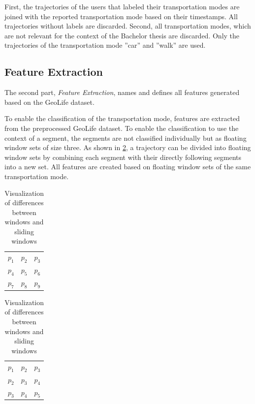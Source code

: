 First, the trajectories of the users that labeled their transportation modes are joined with the reported transportation mode based on their timestamps. All trajectories without labels are discarded. Second, all transportation modes, which are not relevant for the context of the Bachelor thesis are discarded. Only the trajectories of the transportation mode ''car'' and ''walk'' are used.

\subsection{Feature Extraction}
The second part, \textit{Feature Extraction}, names and defines all features generated based on the GeoLife dataset.

To enable the classification of the transportation mode, features are extracted from the preprocessed GeoLife dataset. To enable the classification to use the context of a segment, the segments are not classified individually but as floating window sets of size three. As shown in \ref{table:comp_windows}, a trajectory can be divided into floating window sets by combining each segment with their directly following segments into a new set. All features are created based on floating window sets of the same transportation mode. \cite{Bolbol2012}

\begin{table}[!htb]

    \begin{minipage}{.5\linewidth}
      \centering
        \begin{tabular}{|c c c|} 
        \toprule
        $p_1$ & $p_2$ & $p_3$  \\
        $p_4$ & $p_5$ & $p_6$  \\
        $p_7$ & $p_8$ & $p_9$  \\
        \bottomrule
        \end{tabular}
        \caption*{\small Windows of a trajectory}
    \end{minipage}%
    \begin{minipage}{.5\linewidth}
      \centering
        \begin{tabular}{|c c c|} 
        \toprule
        $p_1$ & $p_2$ & $p_3$  \\
        $p_2$ & $p_3$ & $p_4$  \\
        $p_3$ & $p_4$ & $p_5$  \\
        \bottomrule
    \end{tabular}
    \caption*{\small Sliding windows of a trajectory}
    \end{minipage} 
    
    \caption{Visualization of differences  between windows and sliding windows }
    \label{table:comp_windows}
\end{table}

